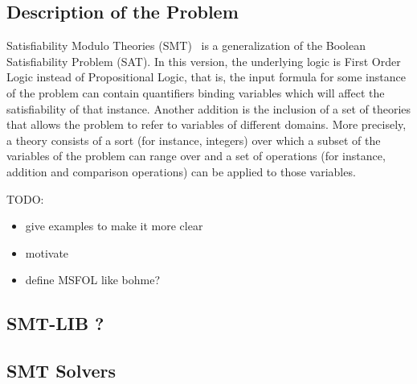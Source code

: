 
\subsection{Description of the Problem}

Satisfiability Modulo Theories (SMT)~\cite{smt} is a generalization of the Boolean
Satisfiability Problem (SAT). In this version, the underlying logic is First Order Logic
instead of Propositional Logic, that is, the input formula for some instance of the
problem can contain quantifiers binding variables which will affect the satisfiability of
that instance. Another addition is the inclusion of a set of theories that allows the
problem to refer to
variables of different domains. More precisely, a theory consists of a sort (for instance, integers) over which a subset of the variables of the problem can range over and a set of operations (for instance, addition and comparison operations) can be applied to those variables.

TODO:
\begin{itemize}
  \item give examples to make it more clear
  \item motivate
  \item define MSFOL like bohme?
\end{itemize}


\subsection{SMT-LIB ?}

\subsection{SMT Solvers}

